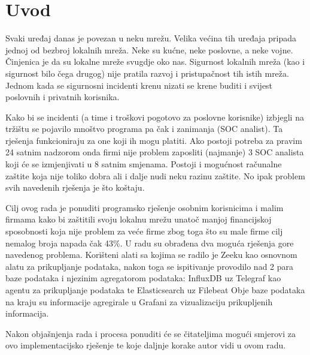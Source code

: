\chapter{Uvod}

Svaki uređaj danas je povezan u neku mrežu. Velika većina tih uređaja pripada jednoj od bezbroj lokalnih mreža. Neke su kućne, neke poslovne, a neke vojne.
Činjenica je da su lokalne mreže svugdje oko nas. Sigurnost lokalnih mreža (kao i sigurnost bilo čega drugog) nije pratila razvoj i pristupačnost tih istih mreža.
Jednom kada se sigurnosni incidenti krenu nizati se krene buditi i svijest poslovnih i privatnih korisnika.

Kako bi se incidenti (a time i troškovi pogotovo za poslovne korisnike) izbjegli na tržištu se pojavilo mnoštvo programa\cite{splunk_docs}\cite{security_onion} pa čak i zanimanja (SOC analist).
Ta rješenja funkcioniraju za one koji ih mogu platiti. Ako postoji potreba za pravim 24 satnim nadzorom onda firmi nije problem zaposliti (najmanje) 3 SOC analista koji će se izmjenjivati u 8 satnim
smjenama. Postoji i mogućnost računalne zaštite koja nije toliko dobra ali i dalje nudi neku razinu zaštite. No ipak problem svih navedenih rješenja je što koštaju.

Cilj ovog rada je ponuditi programsko rješenje osobnim korisnicima i malim firmama kako bi zaštitili svoju lokalnu mrežu unatoč manjoj financijskoj sposobnosti koja nije problem za veće firme zbog toga što su male firme cilj
nemalog broja napada čak 43\%\cite{totalassure_smallbusiness}.
U radu su obrađena dva moguća rješenja gore navedenog problema. Korišteni alati sa kojima se radilo je Zeeku kao osnovnom alatu za prikupljanje podataka, nakon toga se ispitivanje provodilo nad 2 para 
baze podataka i njezinim agregatorom podataka: InfluxDB uz Telegraf kao agentu za prikupljanje podataka te Elasticsearch uz Filebeat Obje baze podataka na kraju su informacije agregirale u Grafani za vizualizaciju 
prikupljenih informacija.

Nakon objašnjenja rada i procesa ponuditi će se čitateljima mogući smjerovi za ovo implementacijsko rješenje te koje daljnje korake autor vidi u ovom radu.